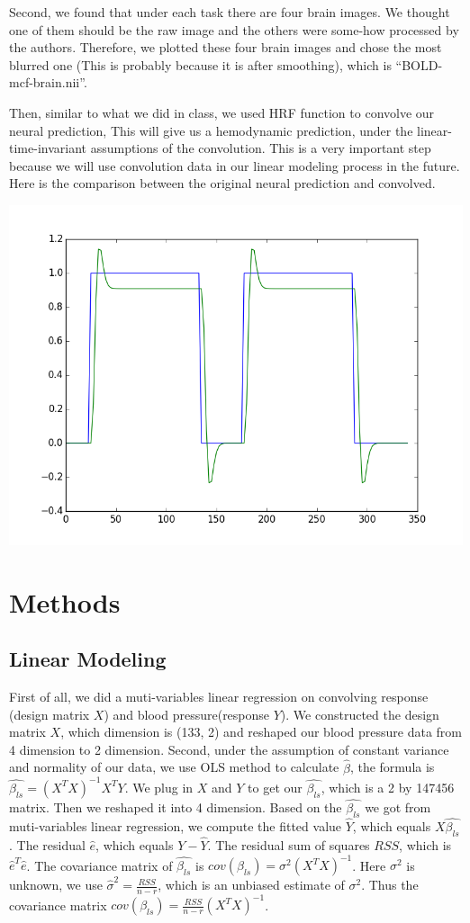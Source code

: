 \documentclass[11pt]{article}
\begin{document}
Second, we found that under each task there are four brain images. We thought one of them should be the raw image and the others were some-how processed by the authors. Therefore, we plotted these four brain images and chose the most blurred one (This is probably because it is after smoothing), which is ``BOLD-mcf-brain.nii''. 

Then, similar to what we did in class, we used HRF function to convolve our neural prediction, This will give us a hemodynamic prediction, under the linear-time-invariant assumptions of the convolution. This is a very important step because we will use convolution data in our linear modeling process in the future. Here is the comparison between the original neural prediction and convolved.

\includegraphics{task001_run001_conv005}

\section{Methods}
\subsection{Linear Modeling}
First of all, we did a muti-variables linear regression on convolving response 
(design matrix $X$) and blood pressure(response $Y$). We constructed the design 
matrix $X$, which dimension is (133, 2) and reshaped our blood pressure data from 
4 dimension to 2 dimension. Second, under the assumption of constant variance
and normality of our data, we use OLS method to calculate $\hat{\beta}$, the 
formula is $\hat{\beta_{ls}}=(X^{T}X)^{-1}X^{T}Y$. We plug in $X$ and $Y$ to get
our $\hat{\beta_{ls}}$, which is a 2 by 147456 matrix. Then we reshaped it into 
4 dimension. Based on the $\hat{\beta_{ls}}$ we got from muti-variables linear 
regression, we compute the fitted value $\hat{Y}$, which equals 
$X\hat{\beta_{ls}}$. The residual $\hat{e}$, which equals $Y-\hat{Y}$. The 
residual sum of squares $RSS$, which is $\hat{e}^{T}\hat{e}$. The covariance
matrix of $\hat{\beta_{ls}}$ is $cov(\beta_{ls}) = \sigma^2(X^{T}X)^{-1}$. Here $\sigma^2$
is unknown, we use $\hat{\sigma}^2 = \frac{RSS}{n-r}$, which is an unbiased 
estimate of $\sigma^2$. Thus the covariance matrix 
$cov(\beta_{ls}) = \frac{RSS}{n-r}(X^{T}X)^{-1}$.
\end{document}
